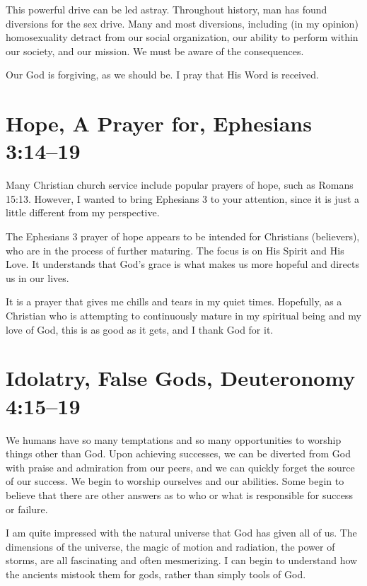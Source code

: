 \documentclass[12pt]{memoir}
\begin{document}
This powerful drive can be led astray. Throughout history, man has
found diversions for the sex drive. Many and most diversions, including
(in my opinion) homosexuality detract from our social organization, our ability to perform within our society, and our mission. We must be aware of the consequences.

Our God is forgiving, as we should be. I pray that His Word is received.

\section[Hope, A Prayer for]{Hope, A Prayer for, Ephesians 3:14--19}

Many Christian church service include popular prayers of hope, such as Romans 15:13. However, I wanted to bring Ephesians 3 to your attention, since it is just a little different from my perspective. 

The Ephesians 3 prayer of hope appears to be intended for Christians (believers), who are in the process of further maturing. The focus is on His Spirit
and His Love. It understands that God's grace is what makes us more hopeful and directs us in our lives.

It is a prayer that gives me chills and tears in my quiet times. Hopefully, as a Christian who is attempting to continuously
mature in my spiritual being and my love of God, this is as good as it gets, and I thank God for it.

\section[Idolatry, False Gods]{Idolatry, False Gods, Deuteronomy 4:15--19}

We humans have so many temptations and so many opportunities to worship
things other than God. Upon achieving successes, we can be diverted
from God with praise and admiration from our peers, and we can quickly
forget the source of our success. We begin to worship ourselves and
our abilities. Some begin to believe that there are other answers as to who or what is responsible for success or failure.

I am quite impressed with the natural universe that God has given
all of us. The dimensions of the universe, the magic of motion and radiation, the power of storms, are all fascinating and often
mesmerizing. I can begin to understand how the ancients mistook them
for gods, rather than simply tools of God. 
\end{document}
